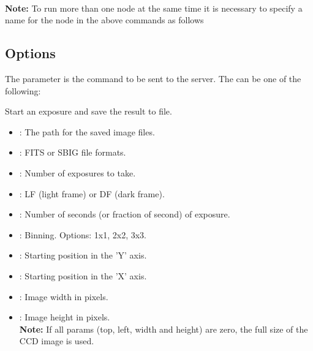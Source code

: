 \documentclass[a4paper,english]{article}
\begin{document}
     \\

\textbf{Note:} To run more than one  node at the same time it is necessary to specify a name for the node in the above commands as follows 


\subsection{Options}

The  parameter is the command to be sent to the server. The  can be one of the following:

\begin{Description}\setlength{\itemsep}{0cm}
\item[\Arg{capture}] Start an exposure and save the result to file.

	                  
	
	\begin{itemize}
		\item {}: The path for the saved image files.
		\item {}: FITS or SBIG file formats.
		\item {}: Number of exposures to take.
		\item {}: LF (light frame) or DF (dark frame).
		\item {}: Number of seconds (or fraction of second) of exposure.
		\item {}: Binning. Options: 1x1, 2x2, 3x3.
		\item {}: Starting position in the 'Y' axis.
		\item {}: Starting position in the 'X' axis.
		\item {}: Image width in pixels.
		\item {}: Image height in pixels. \\
		
		\textbf{Note:} If all params (top, left, width and height) are zero, the full size of the CCD image is used. \\
		

\end{itemize}
\end{Description}
\end{document}
